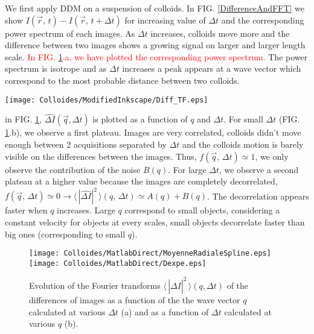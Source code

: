 \documentclass[%
 aip,
 jmp,%
 amsmath,amssymb,
reprint,%
]{revtex4-1}
\begin{document}
We first apply DDM on a suspension of colloids. In FIG. \ref{DifferenceAndFFT} we show $I(\vec{r}, \, t)- I(\vec{r}, \, t+\Delta t)$ for increasing value of $\Delta t$ and the corresponding power spectrum of each images. As $\Delta t$ increases, colloids move more and the difference between two images shows a growing signal on larger and larger length scale. \textcolor{red}{In FIG. \ref{D}.a, we have plotted the corresponding power spectrum.} The power spectrum is isotrope and as $\Delta t$ increases a peak appears at a wave vector which correspond to the most probable distance between two colloids. 

\begin{figure*}
\texttt{[image: Colloides/ModifiedInkscape/Diff\_TF.eps]}
\caption{Image differences of a colloidal suspension and their Fourier transform as a function of $\Delta t$. (a, b, c) Differences between 2 images separated by $\Delta t$. (d, e, f) 2D Fourier transforms of those differences. These differences and Fourier transforms are calculated with $\Delta t = 0.01$ s (a, d), $\Delta t = 1$ s (b, e), $\Delta t = 100$ s (c, f). The unit of the Fourier transforms is arbitrary.}
\label{DifferenceAndFFT}
\end{figure*}


in FIG. \ref{D}, $\widehat{\Delta I}(\vec{q}, \Delta t)$ is plotted as a function of $q$ and $\Delta t$. For small $\Delta t$ (FIG. \ref{D}.b), we observe a first plateau. Images are very correlated, colloids didn't move enough between 2 acquisitions separated by $\Delta t$ and the colloids motion is barely visible on the differences between the images. Thus, $f(\vec{q}, \, \Delta t) \simeq 1$,  we only observe the contribution of the noise $B(q)$. For large $\Delta t$, we observe a second plateau at a higher value because the images are completely decorrelated, $f(\vec{q}, \, \Delta t) \simeq 0 \rightarrow \langle \, |\widehat{\Delta I}|^2 \, \rangle (q, \, \Delta t) \simeq A(q)+B(q)$. The decorrelation appears faster when $q$ increases. Large $q$ correspond to small objects, considering a constant velocity for objects at every scales, small objects decorrelate faster than big ones (corresponding to small $q$).

\begin{figure}
	\texttt{[image: Colloides/MatlabDirect/MoyenneRadialeSpline.eps]}\\
	\texttt{[image: Colloides/MatlabDirect/Dexpe.eps]}
	\caption{Evolution of the Fourier transforms $\langle \, |\widehat{\Delta I}|^2 \, \rangle (q, \Delta t)$ of the differences of images as a function of the the wave vector $q$ calculated at various $\Delta t$ (a) and as a function of $\Delta t$ calculated at various $q$ (b).}
	\label{D}
\end{figure}
\end{document}
